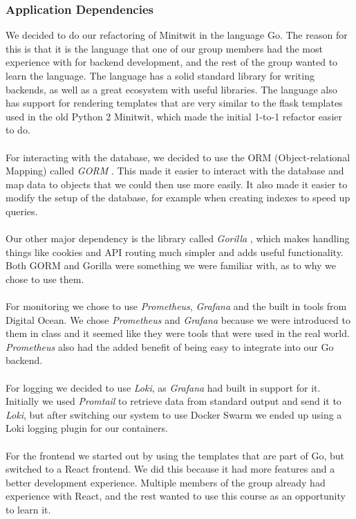 \subsubsection{Application Dependencies}
We decided to do our refactoring of Minitwit in the language Go. The reason for this is that it is the language that one of our group members had the most experience with for backend development, and the rest of the group wanted to learn the language. The language has a solid standard library for writing backends, as well as a great ecosystem with useful libraries. The language also has support for rendering templates that are very similar to the flask templates used in the old Python 2 Minitwit, which made the initial 1-to-1 refactor easier to do.
\\
\\
For interacting with the database, we decided to use the ORM (Object-relational Mapping) called \textit{GORM} \cite{gorm}. This made it easier to interact with the database and map data to objects that we could then use more easily. It also made it easier to modify the setup of the database, for example when creating indexes to speed up queries.
\\
\\
Our other major dependency is the library called \textit{Gorilla} \cite{gorilla}, which makes handling things like cookies and API routing much simpler and adds useful functionality. Both GORM and Gorilla were something we were familiar with, as to why we chose to use them. 
\\
\\
For monitoring we chose to use \textit{Prometheus}, \textit{Grafana} and the built in tools from Digital Ocean. We chose \textit{Prometheus} and \textit{Grafana} because we were introduced to them in class and it seemed like they were tools that were used in the real world. \textit{Prometheus} also had the added benefit of being easy to integrate into our Go backend.
\\
\\
For logging we decided to use \textit{Loki}, as \textit{Grafana} had built in support for it. Initially we used \textit{Promtail} to retrieve data from standard output and send it to \textit{Loki}, but after switching our system to use Docker Swarm we ended up using a Loki logging plugin for our containers.
\\
\\
For the frontend we started out by using the templates that are part of Go, but switched to a React frontend. We did this because it had more features and a better development experience. Multiple members of the group already had experience with React, and the rest wanted to use this course as an opportunity to learn it.

